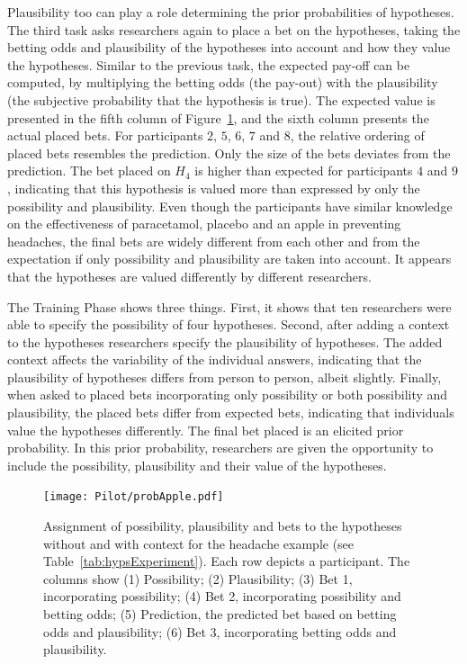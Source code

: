 \documentclass[man]{apa6}
\begin{document}
Plausibility too can play a role determining the prior probabilities of hypotheses.
The third task asks researchers again to place a bet on the hypotheses, taking the betting odds and plausibility of the hypotheses into account and how they value the hypotheses.
Similar to the previous task, the expected pay-off can be computed, by multiplying the betting odds (the pay-out) with the plausibility (the subjective probability that the hypothesis is true).
The expected value is presented in the fifth column of Figure~\ref{fig:probapple}, and the sixth column presents the actual placed bets.
For participants $2$, $5$, $6$, $7$ and $8$, the relative ordering of placed bets resembles the prediction.
Only the size of the bets deviates from the prediction.
The bet placed on $H_4$ is higher than expected for participants $4$ and $9$, indicating that this hypothesis is valued more than expressed by only the possibility and plausibility.
Even though the participants have similar knowledge on the effectiveness of paracetamol, placebo and an apple in preventing headaches, the final bets are widely different from each other and from the expectation if only possibility and plausibility are taken into account.
It appears that the hypotheses are valued differently by different researchers.

The Training Phase shows three things.
First, it shows that ten researchers were able to specify the possibility of four hypotheses.
Second, after adding a context to the hypotheses researchers specify the plausibility of hypotheses.
The added context affects the variability of the individual answers, indicating that the plausibility of hypotheses differs from person to person, albeit slightly.
Finally, when asked to placed bets incorporating only possibility or both possibility and plausibility, the placed bets differ from expected bets, indicating that individuals value the hypotheses differently.
The final bet placed is an elicited prior probability.
In this prior probability, researchers are given the opportunity to include the possibility, plausibility and their value of the hypotheses.


\begin{figure}
	\texttt{[image: Pilot/probApple.pdf]}
	\caption{Assignment of possibility, plausibility and bets to the hypotheses without and with context for the headache example (see Table~\ref{tab:hypsExperiment}). Each row depicts a participant. The columns show (1) Possibility; (2) Plausibility; (3) Bet 1, incorporating possibility; (4) Bet 2, incorporating possibility and betting odds; (5) Prediction, the predicted bet based on betting odds and plausibility; (6) Bet 3, incorporating betting odds and plausibility.}
	\label{fig:probapple}
\end{figure}
\end{document}

